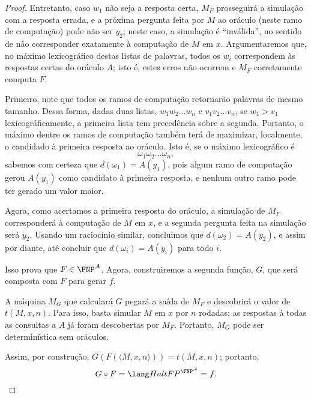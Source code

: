\begin{proof}
    Entretanto, caso $w_1$ não seja a resposta certa,
    $M_F$ prosseguirá a simulação com a resposta errada,
    e a próxima pergunta feita por $M$ ao oráculo
    (neste ramo de computação)
    pode não ser $y_2$;
    neste caso,
    a simulação é ``inválida'',
    no sentido de não corresponder exatamente à computação de $M$ em $x$.
    Argumentaremos que,
    no máximo lexicográfico destas listas de palavras,
    todos os $w_i$ correspondem às respostas certas do oráculo $A$;
    isto é, estes erros não ocorrem
    e $M_F$ corretamente computa $F$.

    Primeiro,
    note que todos os ramos de computação retornarão palavras de mesmo tamanho.
    Dessa forma,
    dadas duas listas, $w_1 w_2 \dots w_n$ e $v_1 v_2 \dots v_n$,
    se $w_1 > v_1$ lexicográficamente,
    a primeira lista tem precedência sobre a segunda.
    Portanto,
    o máximo dentre os ramos de computação
    também terá de maximizar, localmente,
    o candidado à primeira resposta ao oráculo.
    Isto é,
    se o máximo lexicográfico é
    \begin{equation*}
        \omega_1 \omega_2 \dots \omega_n,
    \end{equation*}
    sabemos com certeza que $d(\omega_1) = A(y_1)$,
    pois algum ramo de computação gerou $A(y_1)$ como candidato à primeira resposta,
    e nenhum outro ramo pode ter gerado um valor maior.

    Agora, como acertamos a primeira resposta do oráculo,
    a simulação de $M_F$ corresponderá à computação de $M$ em $x$,
    e a segunda pergunta feita na simulação será $y_2$.
    Usando um raciocínio similar,
    concluimos que $d(\omega_2) = A(y_2)$,
    e assim por diante,
    até concluir que $d(\omega_i) = A(y_i)$ para todo $i$.

    Isso prova que $F \in \FNP^\mathcal A$.
    Agora,
    construiremos a segunda função, $G$,
    que será composta com $F$ para gerar $f$.

    A máquina $M_G$ que calculará $G$
    pegará a saída de $M_F$ e descobrirá o valor de $t(M, x, n)$.
    Para isso,
    basta simular $M$ em $x$ por $n$ rodadas;
    as respostas à todas as consultas a $A$ já foram descobertas por $M_F$.
    Portanto,
    $M_G$ pode ser determinística sem oráculos.

    Assim, por construção, $G(F(\langle M, x, n \rangle)) = t(M, x, n)$;
    portanto,
    \begin{equation*}
        G \circ F = \HaltFP^{\FNP^\mathcal A} = f.
    \end{equation*}


\end{proof}

